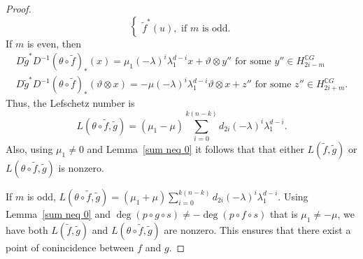 \documentclass{amsart}
\newcommand{\lemref}[1]{Lemma~\ref{#1}}
\newcommand{\remref}[1]{Remark~\ref{#1}}
\begin{document}
\begin{proof}
$$\begin{cases}
		\tilde  f^*(u), \text{ if } m \text{ is odd}.
	\end{cases}$$ 
	If $m$ is even, %
then  
	\begin{equation*}\label{D with theta}
		\begin{split}
			D\tilde g^* D^{-1} (\theta\circ \tilde f)_*(x)=\mu_1(- \lambda)^i\lambda_1^{d-i} x + \vartheta\otimes y''\text{ for some }y'' \in H^{\mathbb CG}_{2i-m} \\
			D\tilde g^* D^{-1} (\theta\circ \tilde f)_*(\vartheta\otimes x)= -\mu (-\lambda)^i\lambda_1^{d-i}\vartheta\otimes x+z'' \text{ for some }z''\in H_{2i+m}^{\mathbb CG}.
		\end{split}
	\end{equation*}
	Thus, %
the Lefschetz number is
	\begin{equation*}\label{L(theta f,g)}
		L(\theta \circ\tilde f,\tilde g) =(\mu_1 - \mu)\sum_{i=0}^{k(n-k)} d_{2i} (-\lambda)^i\lambda_1^{d-i}.
	\end{equation*}
	Also, using  $\mu_1\neq 0$ and \lemref{sum neq 0}  it follows that that either $L(\tilde f, \tilde g)$ or $L(\theta\circ \tilde f,\tilde g)$ is nonzero. 
	
	If $m$ is odd, $	L(\theta \circ\tilde f,\tilde g) =(\mu_1 + \mu)\sum_{i=0}^{k(n-k)} d_{2i} (-\lambda)^i\lambda_1^{d-i}.$ Using  \lemref{sum neq 0} and $\deg(p\circ g \circ s)\neq -\deg (p\circ f\circ s)$ that is $\mu_1 \neq -\mu$, we have both $L(\tilde{f},\tilde{g})$ and $L(\theta \circ\tilde f,\tilde g)$ are nonzero. 
	This ensures that there exist a point of conincidence between $f $ and $g$.
\end{proof}
\end{document}
